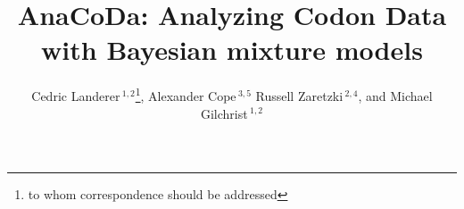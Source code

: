 \documentclass{bioinfo}
\begin{document}

\title[AnaCoDa]{AnaCoDa: Analyzing Codon Data with Bayesian mixture models}
\author[
Landerer \textit{et~al}]{Cedric Landerer\,$^{1,2}$\footnote{
to whom correspondence should be addressed
},
Alexander Cope\,$^{3,5}$
Russell Zaretzki\,$^{2,4}$, and
Michael Gilchrist\,$^{1,2}$
}
\address{$^{1}$
Department of Ecology and Evolutionary Biology,
$^{2}$National Institute for Mathematical and Biological Synthesis,
$^{3}$Genome Science and Technology
$^{4}$Department of Statistics, Operations, and Management Science,
University of Tennessee, Knoxville, TN, USA,
$^{5}$Oak Ridge National Laboratory, Oak Ridge, TN, USA} 


\maketitle
\end{document}
